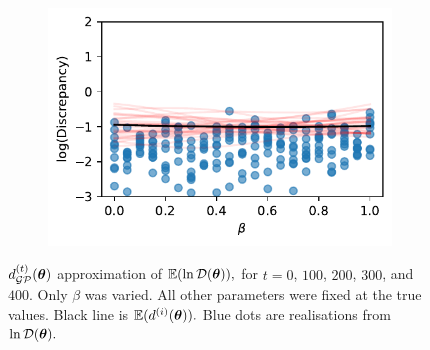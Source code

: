 \begin{figure}[htbp]
\begin{subfigure}[b]{0.5\textwidth}
        \includegraphics[width=\textwidth]{
            ../champagne_GP_images/beta_slice_400_bolfi_updates_log_discrep.pdf
        }
    \end{subfigure}
    \caption{
        $d_{\mathcal{GP}}^{(t)}(\bm{\theta})$ approximation of $\operatorname{\mathbb{E}}(\ln\mathcal{D}(\bm{\theta})),$ 
        for $t= 0$, $100$, $200$, $300$, and $400.$ Only $\beta$ was 
        varied. All other parameters were fixed at the true values. Black line 
        is
        $\operatorname{\mathbb{E}}(d^{(i)}(\bm{\theta})).$
        Blue dots are realisations from $\ln\mathcal{D}(\bm{\theta}).$
    }
\end{figure}

